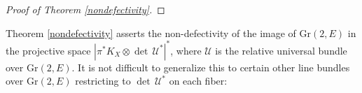 \documentclass[10pt]{amsart}
\numberwithin{equation}{section}
\newcommand{\pp}{\mathbb P}
\newcommand{\cc}{\mathbb C}
\newcommand{\Kx}{K_X}
\newcommand{\U}{\mathcal U}
\newcommand{\Sym}{\mathrm{Sym}}
\newcommand{\Gr}{\mathrm{Gr}}
\newcommand{\cE}{{\mathcal E}}
\begin{document}
\begin{proof}[Proof of Theorem \ref{nondefectivity}]
\end{proof}

Theorem \ref{nondefectivity} asserts the non-defectivity of the image of $\Gr(2, E)$ in the projective space $| \pi^* \Kx \otimes \det \, \U^*|^*$, where $\U$ is the relative universal bundle over $\Gr(2, E)$. %
 It is not difficult to generalize this to certain other line bundles over $\Gr (2, E)$ restricting to $\det \, \U^*$ on each fiber:
\end{document}
